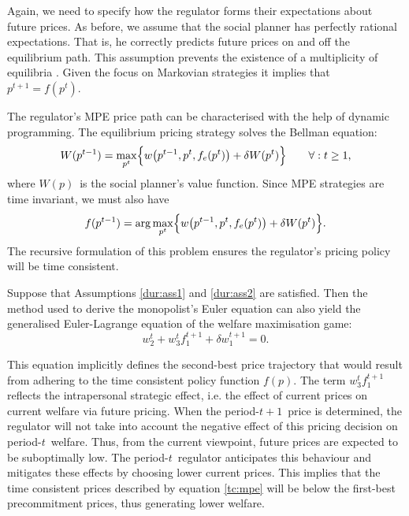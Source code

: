 Again, we need to specify how the regulator forms their expectations about
future prices. As before, we assume that the social planner has perfectly
rational expectations. That is, he correctly predicts future prices on and
off the equilibrium path. This assumption prevents the existence of a
multiplicity of equilibria \citep{Stokey1981}. Given the focus on Markovian
strategies it implies that $p^{t+1}=f(p^{t})$.

The regulator's MPE price path can be characterised with the help of dynamic
programming. The equilibrium pricing strategy solves the Bellman equation: 
\begin{equation}
W(p^{t-1})=\max_{p^{t}}\Bigl\{w\bigl(p^{t-1},p^{t},f_{e}(p^{t})\bigr)+\delta
W(p^{t})\Bigr\}\qquad \forall :t\geq 1\text{,}  \label{tc:bell}
\end{equation}%
where $W(p)$\ is the social planner's value function. Since MPE strategies
are time invariant, we must also have 
\begin{equation}
f(p^{t-1})=\arg \max_{p^{t}}\Bigl\{w\bigl(p^{t-1},p^{t},f_{e}(p^{t})\bigr)%
+\delta W(p^{t})\Bigr\}.  \label{tc:strat}
\end{equation}%
The recursive formulation of this problem ensures the regulator's pricing
policy will be time consistent.

Suppose that Assumptions \ref{dur:ass1} and \ref{dur:ass2} are satisfied.
Then the method used to derive the monopolist's Euler equation can also
yield the generalised Euler-Lagrange equation of the welfare maximisation
game: 
\begin{equation}
w_{2}^{t}+w_{3}^{t}f_{1}^{t+1}+\delta w_{1}^{t+1}=0.  \label{tc:mpe}
\end{equation}

This equation implicitly defines the second-best price trajectory that would
result from adhering to the time consistent policy function $f(p)$. The term 
$w_{3}^{t}f_{1}^{t+1}$ reflects the intrapersonal strategic effect, i.e. the
effect of current prices on current welfare via future pricing. When the
period-$t+1$\ price is determined, the regulator will not take into account
the negative effect of this pricing decision on period-$t$\ welfare. Thus,
from the current viewpoint, future prices are expected to be suboptimally
low. The period-$t$\ regulator anticipates this behaviour and mitigates
these effects by choosing lower current prices. This implies that the time
consistent prices described by equation \eqref{tc:mpe} will be below the
first-best precommitment prices, thus generating lower welfare.

